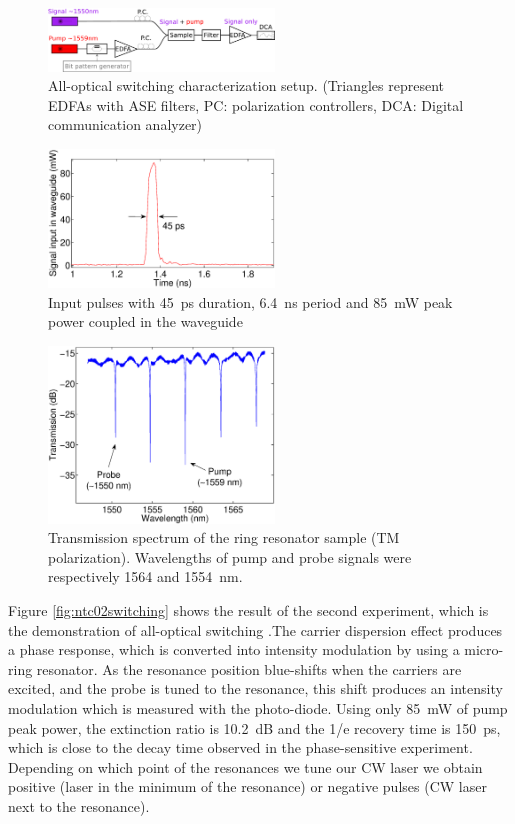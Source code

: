 \documentclass[twocolumn]{el-author}
\begin{document}
\begin{figure}[htb]
    \centering
    \includegraphics[width=60mm]{switching}
    \caption{All-optical switching characterization setup. (Triangles represent EDFAs with ASE filters, PC: polarization controllers, DCA: Digital communication analyzer)}
    \label{fig:switchingSetupSwitching}
\end{figure}

\begin{figure}[htb]
    \centering
    \includegraphics[width=60mm]{inputPulsesSwitchingBig}
    \caption{Input pulses with 45~ps duration, 6.4~ns period and 85~mW peak power coupled in the waveguide}
    \label{fig:inputPulsesSwitchingBig}
\end{figure}

\begin{figure}[htb]
    \centering
    \includegraphics[width=60mm]{broadBig}
    \caption{Transmission spectrum of the ring resonator sample (TM polarization). Wavelengths of pump and probe signals were respectively 1564 and 1554~nm.}
    \label{fig:transmissionSwitching}
\end{figure}

Figure \ref{fig:ntc02switching} shows the result of the second experiment, which is the demonstration of all-optical switching \cite{Oton}.The carrier dispersion effect produces a phase response, which is converted into intensity modulation by using a micro-ring resonator. As the resonance position blue-shifts when the carriers are excited, and the probe is tuned to the resonance, this shift produces an intensity modulation which is measured with the photo-diode. Using only 85~mW of pump peak power, the extinction ratio is 10.2~dB and the 1/e recovery time is 150~ps, which is close to the decay time observed in the phase-sensitive experiment. Depending on which point of the resonances we tune our CW laser we obtain positive (laser in the minimum of the resonance) or negative pulses (CW laser next to the resonance).  
\end{document}
